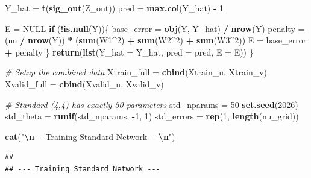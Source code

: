\documentclass[12pt,halfline,a4paper,]{ouparticle}
\newenvironment{Shaded}{\begin{snugshade}}{\end{snugshade}}
\newcommand{\AttributeTok}[1]{\textcolor[rgb]{0.13,0.29,0.53}{#1}}
\newcommand{\CommentTok}[1]{\textcolor[rgb]{0.56,0.35,0.01}{\textit{#1}}}
\newcommand{\ConstantTok}[1]{\textcolor[rgb]{0.56,0.35,0.01}{#1}}
\newcommand{\ControlFlowTok}[1]{\textcolor[rgb]{0.13,0.29,0.53}{\textbf{#1}}}
\newcommand{\DecValTok}[1]{\textcolor[rgb]{0.00,0.00,0.81}{#1}}
\newcommand{\FunctionTok}[1]{\textcolor[rgb]{0.13,0.29,0.53}{\textbf{#1}}}
\newcommand{\NormalTok}[1]{#1}
\newcommand{\OtherTok}[1]{\textcolor[rgb]{0.56,0.35,0.01}{#1}}
\newcommand{\SpecialCharTok}[1]{\textcolor[rgb]{0.81,0.36,0.00}{\textbf{#1}}}
\newcommand{\StringTok}[1]{\textcolor[rgb]{0.31,0.60,0.02}{#1}}
\begin{document}
\begin{Shaded}
\begin{Highlighting}[]
\NormalTok{  Y\_hat }\OtherTok{=} \FunctionTok{t}\NormalTok{(}\FunctionTok{sig\_out}\NormalTok{(Z\_out))}
\NormalTok{  pred }\OtherTok{=} \FunctionTok{max.col}\NormalTok{(Y\_hat) }\SpecialCharTok{{-}} \DecValTok{1}
  
\NormalTok{  E }\OtherTok{=} \ConstantTok{NULL}
  \ControlFlowTok{if}\NormalTok{ (}\SpecialCharTok{!}\FunctionTok{is.null}\NormalTok{(Y))\{}
\NormalTok{    base\_error }\OtherTok{=} \FunctionTok{obj}\NormalTok{(Y, Y\_hat) }\SpecialCharTok{/} \FunctionTok{nrow}\NormalTok{(Y)}
\NormalTok{    penalty }\OtherTok{=}\NormalTok{ (nu }\SpecialCharTok{/} \FunctionTok{nrow}\NormalTok{(Y)) }\SpecialCharTok{*}\NormalTok{ (}\FunctionTok{sum}\NormalTok{(W1}\SpecialCharTok{\^{}}\DecValTok{2}\NormalTok{) }\SpecialCharTok{+} \FunctionTok{sum}\NormalTok{(W2}\SpecialCharTok{\^{}}\DecValTok{2}\NormalTok{) }\SpecialCharTok{+} \FunctionTok{sum}\NormalTok{(W3}\SpecialCharTok{\^{}}\DecValTok{2}\NormalTok{))}
\NormalTok{    E }\OtherTok{=}\NormalTok{ base\_error }\SpecialCharTok{+}\NormalTok{ penalty}
\NormalTok{  \}}
  \FunctionTok{return}\NormalTok{(}\FunctionTok{list}\NormalTok{(}\AttributeTok{Y\_hat =}\NormalTok{ Y\_hat, }\AttributeTok{pred =}\NormalTok{ pred, }\AttributeTok{E =}\NormalTok{ E))}
\NormalTok{\}}

\CommentTok{\# Setup the combined data}
\NormalTok{Xtrain\_full }\OtherTok{=} \FunctionTok{cbind}\NormalTok{(Xtrain\_u, Xtrain\_v)}
\NormalTok{Xvalid\_full }\OtherTok{=} \FunctionTok{cbind}\NormalTok{(Xvalid\_u, Xvalid\_v)}

\CommentTok{\# Standard (4,4) has exactly 50 parameters}
\NormalTok{std\_nparams }\OtherTok{=} \DecValTok{50} 
\FunctionTok{set.seed}\NormalTok{(}\DecValTok{2026}\NormalTok{)}
\NormalTok{std\_theta }\OtherTok{=} \FunctionTok{runif}\NormalTok{(std\_nparams, }\SpecialCharTok{{-}}\DecValTok{1}\NormalTok{, }\DecValTok{1}\NormalTok{)}
\NormalTok{std\_errors }\OtherTok{=} \FunctionTok{rep}\NormalTok{(}\DecValTok{1}\NormalTok{, }\FunctionTok{length}\NormalTok{(nu\_grid))}

\FunctionTok{cat}\NormalTok{(}\StringTok{"}\SpecialCharTok{\textbackslash{}n}\StringTok{{-}{-}{-} Training Standard Network {-}{-}{-}}\SpecialCharTok{\textbackslash{}n}\StringTok{"}\NormalTok{)}
\end{Highlighting}
\end{Shaded}

\begin{verbatim}
## 
## --- Training Standard Network ---
\end{verbatim}
\end{document}
